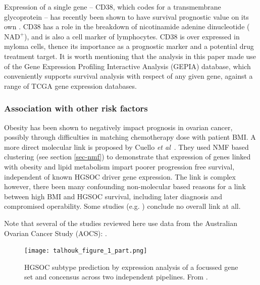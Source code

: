 \documentclass[draft, tikz, 12pt,a4paper,oneside,fleqn]{article}
\newcommand{\etal}{{\em et al\/}}
\begin{document}
Expression of a single gene -- CD38, which codes for a transmembrane glycoprotein -- has recently been shown to have survival prognostic value on its own \cite{Zhu2020}.
CD38 has a role in the breakdown of nicotinamide adenine dinucleotide ($\mbox{NAD}^+$), and is also a cell marker of lymphocytes.
CD38 is over expressed in myloma cells, thence its importance as a prognostic marker and a potential drug treatment target.  
It is worth mentioning that the analysis in this paper made use of the Gene Expression Profiling Interactive Analysis (GEPIA) database, which conveniently supports survival analysis with respect of any given gene, against a range of TCGA gene expression databases.

\subsubsection{Association with other risk factors}

Obesity has been shown to negatively impact prognosis in ovarian cancer, possibly through difficulties in matching chemotherapy dose with patient BMI.  \cite{Au-Yeung2014}  A more direct molecular link is proposed by Cuello \etal\ \cite{Cuello2018}.  They used NMF based clustering (see section \ref{sec-nmf}) to demonstrate that expression of genes linked with obesity and lipid metabolism impart poorer progression free survival, independent of known HGSOC driver gene expression.  The link is complex however, there been many confounding non-molecular based reasons for a link between high BMI and HGSOC survival, including later diagnosis and compromised operability.  Some studies (e.g. \cite{Hew2013}) conclude no overall link at all.

Note that several of the studies reviewed here use data from the Australian Ovarian Cancer Study (AOCS): \cite{Patch2015,Ewing2020,Cuello2018,Au-Yeung2014}.



\begin{figure}
\begin{center}
\texttt{[image: talhouk\_figure\_1\_part.png]}
\end{center}
\caption{HGSOC subtype prediction by expression analysis of a focussed gene set and concensus across two independent pipelines.  From \cite{Talhouk2020}.}
\label{fig-talhouk_figure_1_part.png}
\end{figure}
\end{document}

